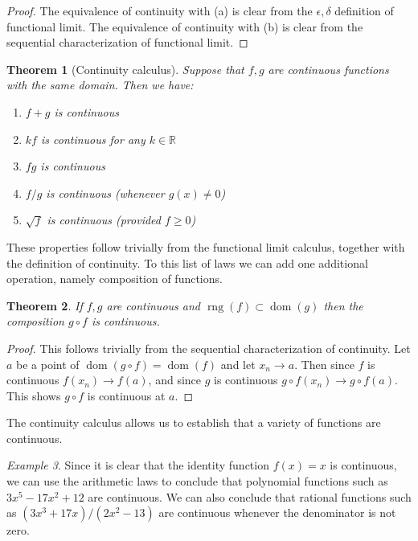 \documentclass[11pt,oneside]{amsbook}
\newcommand{\R}{\mathbb R}
\DeclareMathOperator{\dom}{dom}
\DeclareMathOperator{\rng}{rng}
\theoremstyle{definition}
\theoremstyle{plain}
\newtheorem{theorem}{Theorem}[section]
\theoremstyle{definition}
\theoremstyle{remark}
\newtheorem{example}[theorem]{Example}
\numberwithin{equation}{section}
\numberwithin{figure}{section}
\begin{document}
\begin{proof}
  The equivalence of continuity with (a) is clear from the $\epsilon,\delta$ definition of functional limit. The equivalence of continuity with (b) is clear from the sequential characterization of functional limit.
\end{proof}

\begin{theorem}[Continuity calculus]
  Suppose that $f,g$ are continuous functions with the same domain. Then we have:
  \begin{enumerate}
    \item $f+g$ is continuous
    \item $kf$ is continuous for any $k\in\R$
    \item $fg$ is continuous
    \item $f/g$ is continuous (whenever $g(x)\neq 0$)
    \item $\sqrt{f}$ is continuous (provided $f\geq0$)
  \end{enumerate}
\end{theorem}

These properties follow trivially from the functional limit calculus, together with the definition of continuity. To this list of laws we can add one additional operation, namely composition of functions.

\begin{theorem}
  If $f,g$ are continuous and $\rng(f)\subset\dom(g)$ then the composition $g\circ f$ is continuous.
\end{theorem}

\begin{proof}
  This follows trivially from the sequential characterization of continuity. Let $a$ be a point of $\dom(g\circ f)=\dom(f)$ and let $x_n\to a$. Then since $f$ is continuous $f(x_n)\to f(a)$, and since $g$ is continuous $g\circ f(x_n)\to g\circ f(a)$. This shows $g\circ f$ is continuous at $a$.
\end{proof}

The continuity calculus allows us to establish that a variety of functions are continuous.

\begin{example}
  Since it is clear that the identity function $f(x)=x$ is continuous, we can use the arithmetic laws to conclude that polynomial functions such as $3x^5-17x^2+12$ are continuous. We can also conclude that rational functions such as $(3x^3+17x)/(2x^2-13)$ are continuous whenever the denominator is not zero.
\end{example}
\end{document}
